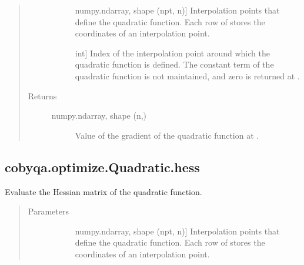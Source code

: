 \documentclass[letterpaper,10pt,english]{sphinxmanual}
\begin{document}
\begin{fulllineitems}
\begin{fulllineitems}
\begin{quote}
\begin{description}
\begin{description}
\item[{}] \leavevmode{[}numpy.ndarray, shape (npt, n){]}
\sphinxAtStartPar
Interpolation points that define the quadratic function. Each row of
 stores the coordinates of an interpolation point.

\item[{}] \leavevmode{[}int{]}
\sphinxAtStartPar
Index of the interpolation point around which the quadratic function
is defined. The constant term of the quadratic function is not
maintained, and zero is returned at .

\end{description}

\item[{Returns}] \leavevmode\begin{description}
\item[{numpy.ndarray, shape (n,)}] \leavevmode
\sphinxAtStartPar
Value of the gradient of the quadratic function at .

\end{description}

\end{description}\end{quote}

\end{fulllineitems}



\subsection{cobyqa.optimize.Quadratic.hess}
\label{\detokenize{refs/generated/cobyqa.optimize.Quadratic.hess:cobyqa-optimize-quadratic-hess}}\label{\detokenize{refs/generated/cobyqa.optimize.Quadratic.hess::doc}}

\begin{fulllineitems}
\label{\detokenize{refs/generated/cobyqa.optimize.Quadratic.hess:cobyqa.optimize.Quadratic.hess}}
\sphinxAtStartPar
Evaluate the Hessian matrix of the quadratic function.
\begin{quote}\begin{description}
\item[{Parameters}] \leavevmode\begin{description}
\item[{}] \leavevmode{[}numpy.ndarray, shape (npt, n){]}
\sphinxAtStartPar
Interpolation points that define the quadratic function. Each row of
 stores the coordinates of an interpolation point.


\end{description}
\end{description}
\end{quote}
\end{fulllineitems}
\end{fulllineitems}
\end{document}

